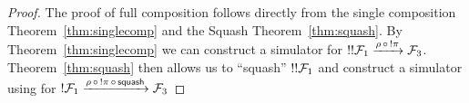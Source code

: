 \begin{proof}
The proof of full composition follows directly from the single composition Theorem~\ref{thm:singlecomp} and the Squash Theorem~\ref{thm:squash}.
By Theorem~\ref{thm:singlecomp} we can construct a simulator  for $!!\mathcal{F}_1 \xrightarrow{\rho \, \circ \, !\pi} \mathcal{F}_3$.
Theorem~\ref{thm:squash} then allows us to ``squash'' $!!\mathcal{F}_1$ and construct a simulator using  for $!\mathcal{F}_1 \xrightarrow{\rho \, \circ \, !\pi \, \circ \, {\mathsf {squash}}} \mathcal{F}_3$
\end{proof}
